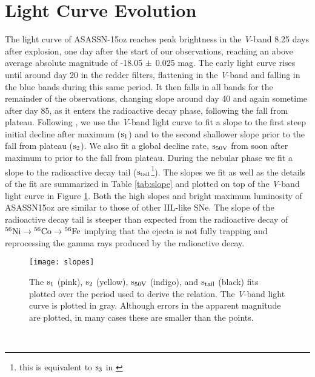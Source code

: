 \documentclass[a4paper,fleqn,usenatbib]{mnras}
\begin{document}
\section{Light Curve Evolution} \label{sec:LCEvolve}
The light curve of ASASSN-15oz reaches peak brightness in the {\it V}-band 8.25 days after explosion, one day after the start of our observations, reaching an above average absolute magnitude of -18.05 $\rm{\pm}$ 0.025 mag.
The early light curve rises until around day 20 in the redder filters, flattening in the {\it V}-band and falling in the blue bands during this same period. 
It then falls in all bands for the remainder of the observations, changing slope around day 40 and again sometime after day 85, as it enters the radioactive decay phase, following the fall from plateau. 
Following \citet{2014anderson}, we use the {\it V}-band light curve to fit a slope to the first steep initial decline after maximum ($\rm{s_1}$) and to the second shallower slope prior to the fall from plateau ($\rm{s_2}$). 
We also fit a global decline rate, $\rm{s_{50V}}$ from soon after maximum to prior to the fall from plateau.
During the nebular phase we fit a slope to the radioactive decay tail ($\rm{s_{tail}}$\footnote{this is equivalent to $\rm{s_{3}}$ in \citet{2014anderson}}). 
The slopes we fit as well as the details of the fit are summarized in Table \ref{tab:slope} and plotted on top of the {\it V}-band light curve in Figure \ref{fig:slopes}.
Both the high slopes and bright maximum luminosity of ASASSN15oz are similar to those of other IIL-like SNe. 
The slope of the radioactive decay tail is steeper than expected from the radioactive decay of $\rm{{}^{56}Ni \rightarrow {}^{56}Co \rightarrow {}^{56}Fe}$ implying that the ejecta is not fully trapping and reprocessing the gamma rays produced by the radioactive decay.
\begin{figure}
\begin{center}
\texttt{[image: slopes]} %
\caption{The $\rm{s_{1}}$ (pink), $\rm{s_{2}}$ (yellow), $\rm{s_{50V}}$ (indigo), and $\rm{ s_{tail}}$ (black) fits plotted over the period used to derive the relation. 
The {\it V}-band light curve is plotted in gray. 
Although errors in the apparent magnitude are plotted, in many cases these are smaller than the points.}
\label{fig:slopes}
\end{center}
\end{figure}\\
\end{document}
